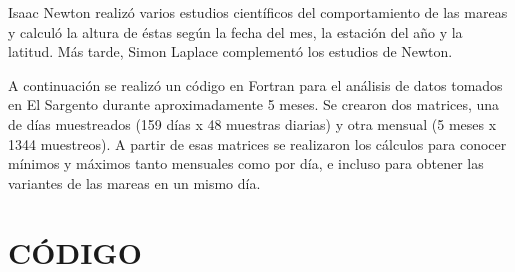 \documentclass[letterpaper,10pt,twoside,onecolumn]{article}
\begin{document}
Isaac Newton realizó varios estudios científicos del comportamiento de las mareas y calculó la altura de éstas según la fecha del mes, la estación del año y la latitud. Más tarde, Simon Laplace complementó los estudios de Newton. 

A continuación se realizó un código en Fortran para el análisis de datos tomados en El Sargento durante aproximadamente 5 meses. 
Se crearon dos matrices, una de días muestreados (159 días x 48 muestras diarias) y otra mensual (5 meses x 1344 muestreos). 
A partir de esas matrices se realizaron los cálculos para conocer mínimos y máximos tanto mensuales como por día, e incluso para obtener las variantes de las mareas en un mismo día.

\section{CÓDIGO}
\end{document}
